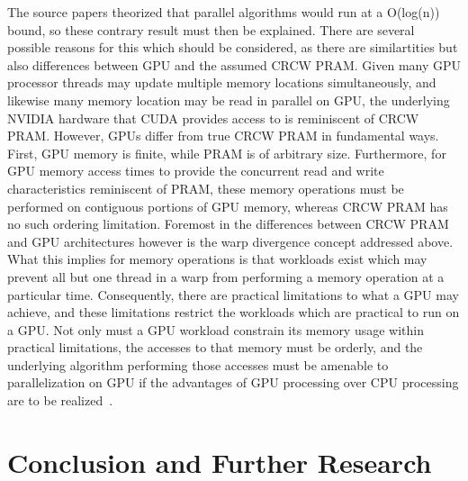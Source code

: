 \documentclass[letterpaper, 12pt]{article}
\let\supercite\cite
\renewcommand{\cite}[1]{\textnormal{~\supercite{#1}}}
\begin{document}
  The source papers theorized that parallel algorithms would run at a O(log(n)) bound, so these contrary result must then be explained.  There are several possible reasons for this which should be considered, as there are similartities but also differences between GPU and the assumed CRCW PRAM.  Given many GPU processor threads may update multiple memory locations simultaneously, and likewise many memory location may be read in parallel on GPU, the underlying NVIDIA hardware that CUDA provides access to is reminiscent of CRCW PRAM.  However, GPUs differ from true CRCW PRAM in fundamental ways.  First, GPU memory is finite, while PRAM is of arbitrary size.  Furthermore, for GPU memory access times to provide the concurrent read and write characteristics reminiscent of PRAM, these memory operations must be performed on contiguous portions of GPU memory, whereas CRCW PRAM has no such ordering limitation.  Foremost in the differences between CRCW PRAM and GPU architectures however is the warp divergence concept addressed above.  What this implies for memory operations is that workloads exist which may prevent all but one thread in a warp from performing a memory operation at a particular time.  Consequently, there are practical limitations to what a GPU may achieve, and these limitations restrict the workloads which are practical to run on a GPU.  Not only must a GPU workload constrain its memory usage within practical limitations, the accesses to that memory must be orderly, and the underlying algorithm performing those accesses must be amenable to parallelization on GPU if the advantages of GPU processing over CPU processing are to be realized\cite{dehne2010exploring}. 

\section{Conclusion and Further Research}

\clearpage

\nocite{*}
\end{document}
